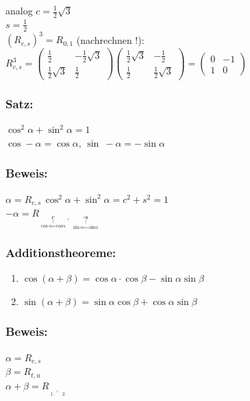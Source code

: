  analog $ c= \frac{1}{2}\sqrt{3}$ \\
 $s=\frac{1}{2}$\\
 $(R_{c,s})^{3} = R_{0,1}$ (nachrechnen !): $R_{c,s}^{3} = \begin{pmatrix} \frac{1}{2} & -\frac{1}{2}\sqrt{3} \\ \frac{1}{2}\sqrt{3} & \frac{1}{2} \end{pmatrix}\begin{pmatrix} \frac{1}{2}\sqrt{3} & -\frac{1}{2} \\ \frac{1}{2} & \frac{1}{2}\sqrt{3} \end{pmatrix} = \begin{pmatrix} 0 & -1 \\ 1 & 0 \end{pmatrix}$
 \subsubsection{Satz:}
 $\cos^{2}\alpha + \sin^{2}\alpha =1$\\
 $\cos -\alpha=\cos\alpha, \, \sin\ -\alpha=-\sin\alpha$
%
 \subsubsection{Beweis:}
 $\alpha = R_{c,s} \, \cos^{2}\alpha+\sin^{2}\alpha= c^{2}+s^{2}=1$\\
 $-\alpha=R_{\mathop{c}\limits_{\mathop{\cos-\alpha = \cos \alpha}\limits^{\uparrow}}, \, \mathop{-s}\limits_{\mathop{\sin-\alpha = -\sin\alpha}\limits^{\uparrow}}}$\\
 \subsubsection{Additionstheoreme:}
 \begin{enumerate}
 	\item $\cos(\alpha+\beta) = \cos\alpha\cdot\cos\beta-\sin\alpha\sin\beta$
 	\item $\sin(\alpha+\beta)=\sin\alpha\cos\beta+\cos\alpha\sin\beta$
\end{enumerate}
%
%
%
\subsubsection{Beweis:}
$\alpha=R_{c,s}$\\
$\beta=R_{t,u}$\\
$\alpha+\beta=R_{\mathop{\underbrace{ct-su}}\limits_{1.},\, \mathop{\underbrace{cu+st}}\limits_{2.}}$
%
%
%
